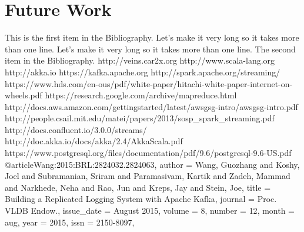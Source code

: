 \documentclass{thesis}
\begin{document}
\section{Future Work}


\begin{singlespace}
\begin{thebibliography}{99}
 This is the first item in the Bibliography.
Let's make it very long so it takes more than one line.
Let's make it very long so it takes more than one line.
 The second item in the Bibliography.
    http://veins.car2x.org %
    http://www.scala-lang.org %
    http://akka.io %
    https://kafka.apache.org %
    http://spark.apache.org/streaming/ %
    https://www.hds.com/en-ous/pdf/white-paper/hitachi-white-paper-internet-on-wheels.pdf
    https://research.google.com/archive/mapreduce.html
    http://docs.aws.amazon.com/gettingstarted/latest/awsgsg-intro/awsgsg-intro.pdf %
    http://people.csail.mit.edu/matei/papers/2013/sosp\_spark\_streaming.pdf %
    http://docs.confluent.io/3.0.0/streams/
    http://doc.akka.io/docs/akka/2.4/AkkaScala.pdf
    https://www.postgresql.org/files/documentation/pdf/9.6/postgresql-9.6-US.pdf
@article{Wang:2015:BRL:2824032.2824063,
     author = {Wang, Guozhang and Koshy, Joel and Subramanian, Sriram and Paramasivam, Kartik and Zadeh, Mammad and Narkhede, Neha and Rao, Jun and Kreps, Jay and Stein, Joe},
     title = {Building a Replicated Logging System with Apache Kafka},
     journal = {Proc. VLDB Endow.},
     issue\_date = {August 2015},
     volume = {8},
     number = {12},
     month = aug,
     year = {2015},
     issn = {2150-8097},
}
\end{thebibliography}
\end{singlespace}
\end{document}
